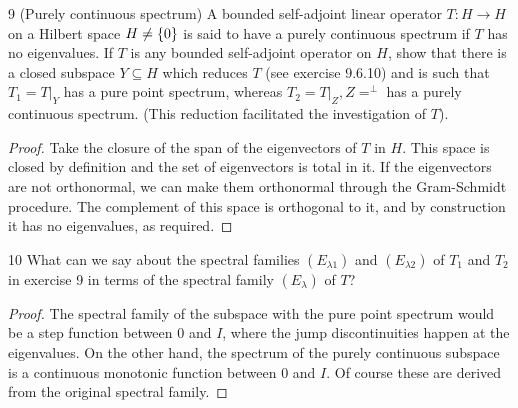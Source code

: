 \begin{exercise}{9 (Purely continuous spectrum)}
A bounded self-adjoint linear operator $T: H \to H$ on a Hilbert space $H \neq \{0\}$ is said to have a purely continuous spectrum if $T$ has no eigenvalues.
If $T$ is any bounded self-adjoint operator on $H$, show that there is a closed subspace $Y \subseteq H$ which reduces $T$ (see exercise 9.6.10) and is such that $T_1 = T|_Y$ has a pure point spectrum, whereas $T_2 = T|_Z, Z = ^\perp$ has a purely continuous spectrum.
(This reduction facilitated the investigation of $T$).
\end{exercise}
\begin{proof}
Take the closure of the span of the eigenvectors of $T$ in $H$.
This space is closed by definition and the set of eigenvectors is total in it.
If the eigenvectors are not orthonormal, we can make them orthonormal through the Gram-Schmidt procedure.
The complement of this space is orthogonal to it, and by construction it has no eigenvalues, as required.
\end{proof} 

\begin{exercise}{10}
What can we say about the spectral families $(E_{\lambda 1})$ and $(E_{\lambda 2})$ of $T_1$ and $T_2$ in exercise 9 in terms of the spectral family $(E_\lambda)$ of $T$?
\end{exercise}
\begin{proof}
The spectral family of the subspace with the pure point spectrum would be a step function between 0 and $I$, where the jump discontinuities happen at the eigenvalues.
On the other hand, the spectrum of the purely continuous subspace is a continuous monotonic function between 0 and $I$.
Of course these are derived from the original spectral family.
\end{proof} 
